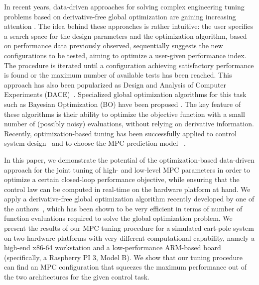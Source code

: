 \documentclass{article}
\begin{document}
In recent years, data-driven approaches for solving complex engineering tuning problems based on derivative-free global optimization are gaining increasing attention \citep{shahriari2016taking}.
The idea behind these approaches is rather intuitive: the user specifies a search space for the design parameters and the optimization algorithm, based on performance data previously  observed, sequentially suggests the new configurations to be tested, aiming to optimize a user-given performance index. The procedure is iterated until a configuration achieving satisfactory performance is found or the maximum number of available tests has been reached.
This approach has also been popularized as Design and Analysis of Computer Experiments (DACE)~\citep{SWMW89}.
Specialized global optimization algorithms for this task such as Bayesian Optimization
(BO) have been proposed \citep{brochu2010tutorial}. The key feature of these algorithms is their
ability to optimize the objective function with a small number of (possibly noisy) evaluations, without relying on derivative information. 
Recently, optimization-based tuning has been successfully applied to control system design~\citep{roveda2019control, driess2017constrained} and  to choose the MPC prediction model ~\citep{piga2019performance, bansal2017goal}. 

In this paper, we demonstrate the potential of the optimization-based data-driven approach for the joint tuning of high- and low-level MPC parameters in order to optimize a certain closed-loop performance objective, while ensuring that the control law can be  computed in real-time on the hardware platform at hand.   
We apply a  derivative-free global optimization algorithm recently developed by one of the authors~\citep{bemporad2019global}, which has been shown to be very efficient in terms of number of function evaluations  required to solve the global optimization problem.  
We  present the results of our MPC tuning procedure for a simulated cart-pole system on two hardware platforms with very different computational capability, namely a high-end x86-64 workstation and a low-performance ARM-based board (specifically, a Raspberry PI 3, Model B). We show that our tuning procedure can find an MPC configuration that squeezes the maximum performance out of the two architectures for the given control task.
\end{document}
